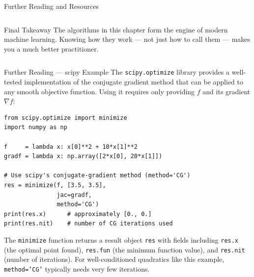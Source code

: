 \documentclass[aspectratio=169,10pt]{beamer}
\begin{document}
\begin{frame}[allowframebreaks]{Further Reading and Resources}
\begin{columns}[T]
      \begin{alertblock}{Final Takeaway}
        The algorithms in this chapter form the engine of modern
        machine learning.  Knowing how they work --- not just
        how to call them --- makes you a much better practitioner.
      \end{alertblock}
  \end{columns}

\end{frame}

\begin{frame}[fragile]{Further Reading --- scipy Example}
  The \texttt{scipy.optimize} library provides a well-tested
  implementation of the conjugate gradient method that can be
  applied to any smooth objective function.  Using it requires
  only providing $f$ and its gradient $\nabla f$:

  \vspace{0.5em}
\begin{lstlisting}[caption={scipy Conjugate Gradient Example}]
from scipy.optimize import minimize
import numpy as np

f     = lambda x: x[0]**2 + 10*x[1]**2
gradf = lambda x: np.array([2*x[0], 20*x[1]])

# Use scipy's conjugate-gradient method (method='CG')
res = minimize(f, [3.5, 3.5],
               jac=gradf,
               method='CG')
print(res.x)      # approximately [0., 0.]
print(res.nit)    # number of CG iterations used
\end{lstlisting}

  \vspace{0.5em}
  The \texttt{minimize} function returns a result object
  \texttt{res} with fields including \texttt{res.x} (the
  optimal point found), \texttt{res.fun} (the minimum
  function value), and \texttt{res.nit} (number of iterations).
  For well-conditioned quadratics like this example, \texttt{method='CG'}
  typically needs very few iterations.
\end{frame}
\end{document}
